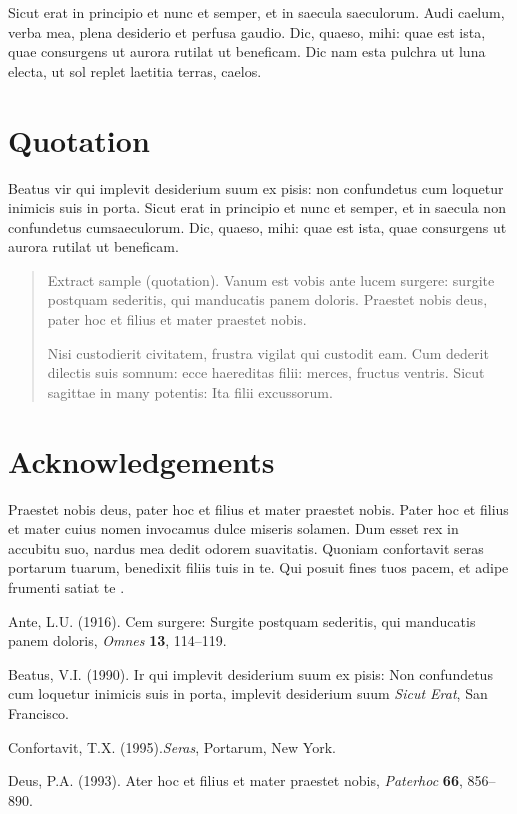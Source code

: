 \documentclass{ao2e}%
\begin{document}
Sicut erat in principio et nunc et semper, et in saecula saeculorum.
Audi caelum, verba mea, plena desiderio et perfusa gaudio. Dic,
quaeso, mihi: quae est ista, quae consurgens ut aurora rutilat ut
beneficam. Dic nam esta pulchra ut luna electa, ut sol replet
laetitia terras, caelos.

\section{Quotation}

Beatus vir qui implevit desiderium
suum ex pisis: non confundetus cum loquetur inimicis suis in porta.
Sicut erat in principio et nunc et semper, et in saecula non
confundetus cumsaeculorum. Dic, quaeso, mihi: quae est ista, quae
consurgens ut aurora rutilat ut beneficam.

\begin{quotation}
Extract sample (quotation). Vanum est vobis ante lucem surgere: surgite postquam
sederitis, qui manducatis panem doloris. Praestet nobis deus, pater
hoc et filius et mater praestet nobis.

Nisi custodierit civitatem,
frustra vigilat qui custodit eam. Cum dederit dilectis suis somnum:
ecce haereditas filii: merces, fructus ventris. Sicut sagittae in
many potentis: Ita filii excussorum.
\end{quotation}


\section*{Acknowledgements}

Praestet nobis deus, pater
hoc et filius et mater praestet nobis. Pater hoc et filius et mater
cuius nomen invocamus dulce miseris solamen. Dum esset rex in
accubitu suo, nardus mea dedit odorem suavitatis. Quoniam confortavit
seras portarum tuarum, benedixit filiis tuis in te. Qui posuit fines tuos
pacem, et adipe frumenti satiat te \cite{r1,r2}.


\begin{thebibliography}{}

Ante, L.U. (1916). Cem surgere: Surgite postquam sederitis, qui
manducatis panem doloris, \textit{Omnes} \textbf{13}, 114--119.

Beatus, V.I. (1990). Ir qui implevit desiderium suum ex pisis: Non
confundetus cum loquetur inimicis suis in porta, implevit desiderium suum
\textit{Sicut Erat}, San Francisco.

Confortavit, T.X. (1995).\textit{Seras}, Portarum, New York.

Deus, P.A. (1993). Ater hoc et filius et mater praestet nobis,
\textit{Paterhoc} \textbf{66}, 856--890.

\end{thebibliography}
\end{document}
